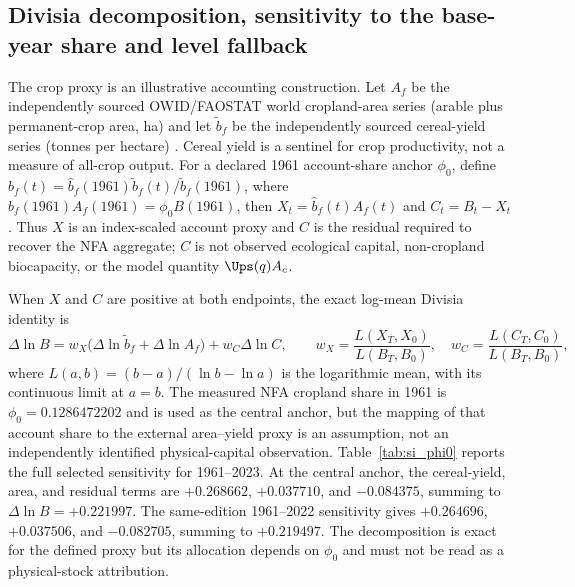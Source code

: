 \newpage
\subsection{Divisia decomposition, sensitivity to the base-year share and level fallback}\label{si:divisia}

The crop proxy is an illustrative accounting construction. Let $A_f$ be the independently sourced OWID/FAOSTAT world cropland-area series (arable plus permanent-crop area, ha) and let $\tilde b_f$ be the independently sourced cereal-yield series (tonnes per hectare) \citep{OWIDCropland2026,OWIDCereal2026}. Cereal yield is a sentinel for crop productivity, not a measure of all-crop output. For a declared 1961 account-share anchor $\phi_0$, define $\hat b_f(t)=\hat b_f(1961)\tilde b_f(t)/\tilde b_f(1961)$, where $\hat b_f(1961)A_f(1961)=\phi_0B(1961)$, then $X_t=\hat b_f(t)A_f(t)$ and $C_t=B_t-X_t$. Thus $X$ is an index-scaled account proxy and $C$ is the residual required to recover the NFA aggregate; $C$ is not observed ecological capital, non-cropland biocapacity, or the model quantity $\Ups(q)A_c$.

When $X$ and $C$ are positive at both endpoints, the exact log-mean Divisia identity is
\begin{equation}
\Delta\ln B=w_X\bigl(\Delta\ln\tilde b_f+\Delta\ln A_f\bigr)+w_C\Delta\ln C,
\qquad w_X=\frac{L(X_T,X_0)}{L(B_T,B_0)},\quad w_C=\frac{L(C_T,C_0)}{L(B_T,B_0)},
\end{equation}
where $L(a,b)=(b-a)/(\ln b-\ln a)$ is the logarithmic mean, with its continuous limit at $a=b$. The measured NFA cropland share in 1961 is $\phi_0=0.1286472202$ and is used as the central anchor, but the mapping of that account share to the external area--yield proxy is an assumption, not an independently identified physical-capital observation. Table~\ref{tab:si_phi0} reports the full selected sensitivity for 1961--2023. At the central anchor, the cereal-yield, area, and residual terms are $+0.268662$, $+0.037710$, and $-0.084375$, summing to $\Delta\ln B=+0.221997$. The same-edition 1961--2022 sensitivity gives $+0.264696$, $+0.037506$, and $-0.082705$, summing to $+0.219497$. The decomposition is exact for the defined proxy but its allocation depends on $\phi_0$ and must not be read as a physical-stock attribution.

